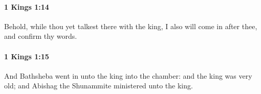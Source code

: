 		\paragraph{1 Kings 1:14} %
			\label{1KINGS-1-14}

			Behold, while thou yet talkest there with the king, I also will come in after thee, and confirm thy words.


		\paragraph{1 Kings 1:15} %
			\label{1KINGS-1-15}

			And Bathsheba went in unto the king into the chamber: and the king was very old; and Abishag the Shunammite ministered unto the king.


